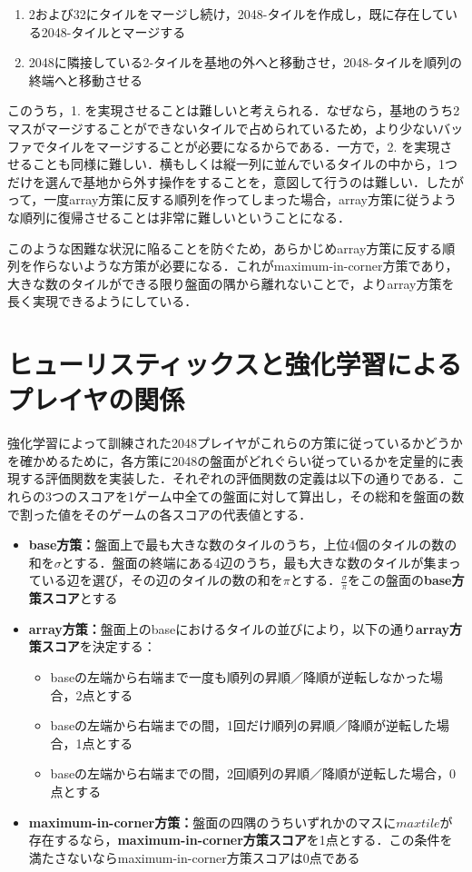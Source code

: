 \documentclass{suribt}
\begin{document}
\begin{enumerate}
\item 2および32にタイルをマージし続け，2048-タイルを作成し，既に存在している2048-タイルとマージする
\item 2048に隣接している2-タイルを基地の外へと移動させ，2048-タイルを順列の終端へと移動させる
\end{enumerate}

このうち，1. を実現させることは難しいと考えられる．なぜなら，基地のうち2マスがマージすることができないタイルで占められているため，より少ないバッファでタイルをマージすることが必要になるからである．一方で，2. を実現させることも同様に難しい．横もしくは縦一列に並んでいるタイルの中から，1つだけを選んで基地から外す操作をすることを，意図して行うのは難しい．したがって，一度array方策に反する順列を作ってしまった場合，array方策に従うような順列に復帰させることは非常に難しいということになる．

このような困難な状況に陥ることを防ぐため，あらかじめarray方策に反する順列を作らないような方策が必要になる．これがmaximum-in-corner方策であり，大きな数のタイルができる限り盤面の隅から離れないことで，よりarray方策を長く実現できるようにしている．

\section{ヒューリスティックスと強化学習によるプレイヤの関係}
強化学習によって訓練された2048プレイヤがこれらの方策に従っているかどうかを確かめるために，各方策に2048の盤面がどれぐらい従っているかを定量的に表現する評価関数を実装した．それぞれの評価関数の定義は以下の通りである．これらの3つのスコアを1ゲーム中全ての盤面に対して算出し，その総和を盤面の数で割った値をそのゲームの各スコアの代表値とする．

\begin{itemize}
\item \textbf{base方策：}盤面上で最も大きな数のタイルのうち，上位4個のタイルの数の和を${\sigma}$とする．盤面の終端にある4辺のうち，最も大きな数のタイルが集まっている辺を選び，その辺のタイルの数の和を${\pi}$とする．$\displaystyle \frac{\sigma}{\pi}$をこの盤面の\textbf{base方策スコア}とする
\item \textbf{array方策：}盤面上のbaseにおけるタイルの並びにより，以下の通り\textbf{array方策スコア}を決定する：
\begin{itemize}
\item baseの左端から右端まで一度も順列の昇順／降順が逆転しなかった場合，2点とする
\item baseの左端から右端までの間，1回だけ順列の昇順／降順が逆転した場合，1点とする
\item baseの左端から右端までの間，2回順列の昇順／降順が逆転した場合，0点とする
\end{itemize}
\item \textbf{maximum-in-corner方策：}盤面の四隅のうちいずれかのマスに$maxtile$が存在するなら，\textbf{maximum-in-corner方策スコア}を1点とする．この条件を満たさないならmaximum-in-corner方策スコアは0点である
\end{itemize}
\end{document}
